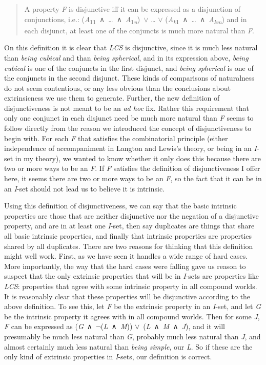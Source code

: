 \documentclass[
  10pt,
  letterpaper,
  DIV=11,
  numbers=noendperiod,
  twoside]{scrartcl}
\begin{document}
\begin{quote}
A property \emph{F} is disjunctive iff it can be expressed as a
disjunction of conjunctions, i.e.:
(\emph{A}\textsubscript{11}~∧~\ldots~∧~\emph{A}\textsubscript{1\emph{n}})~\({\vee}\)
\ldots{} \({\vee}\)
(\emph{A\textsubscript{k}}\textsubscript{1}~∧~\ldots~∧~\emph{A\textsubscript{km}})
and in each disjunct, at least one of the conjuncts is much more natural
than \emph{F}.
\end{quote}

On this definition it is clear that \emph{LCS} is disjunctive, since it
is much less natural than \emph{being cubical} and than \emph{being
spherical}, and in its expression above, \emph{being cubical} is one of
the conjuncts in the first disjunct, and \emph{being spherical} is one
of the conjuncts in the second disjunct. These kinds of comparisons of
naturalness do not seem contentious, or any less obvious than the
conclusions about extrinsicness we use them to generate. Further, the
new definition of disjunctiveness is not meant to be an \emph{ad hoc}
fix. Rather this requirement that only one conjunct in each disjunct
need be much more natural than \emph{F} seems to follow directly from
the reason we introduced the concept of disjunctiveness to begin with.
For each \emph{F} that satisfies the combinatorial principle (either
independence of accompaniment in Langton and Lewis's theory, or being in
an \emph{I}-set in my theory), we wanted to know whether it only does
this because there are two or more ways to be an \emph{F}. If \emph{F}
satisfies the definition of disjunctiveness I offer here, it seems there
are two or more ways to be an \emph{F}, so the fact that it can be in an
\emph{I}-set should not lead us to believe it is intrinsic.

Using this definition of disjunctiveness, we can say that the basic
intrinsic properties are those that are neither disjunctive nor the
negation of a disjunctive property, and are in at least one
\emph{I}-set, then say duplicates are things that share all basic
intrinsic properties, and finally that intrinsic properties are
properties shared by all duplicates. There are two reasons for thinking
that this definition might well work. First, as we have seen it handles
a wide range of hard cases. More importantly, the way that the hard
cases were falling gave us reason to suspect that the only extrinsic
properties that will be in \emph{I}-sets are properties like \emph{LCS}:
properties that agree with some intrinsic property in all compound
worlds. It is reasonably clear that these properties will be disjunctive
according to the above definition. To see this, let \emph{F} be the
extrinsic property in an \emph{I}-set, and let \emph{G} be the intrinsic
property it agrees with in all compound worlds. Then for some \emph{J},
\emph{F} can be expressed as
(\emph{G}~∧~\({\lnot}\)(\emph{L}~∧~\emph{M}))
\({\vee}\)~(\emph{L}~∧~\emph{M}~∧~\emph{J}), and it will presumably be
much less natural than \emph{G}, probably much less natural than
\emph{J}, and almost certainly much less natural than \emph{being
simple}, our \emph{L}. So if these are the only kind of extrinsic
properties in \emph{I}-sets, our definition is correct.
\end{document}
